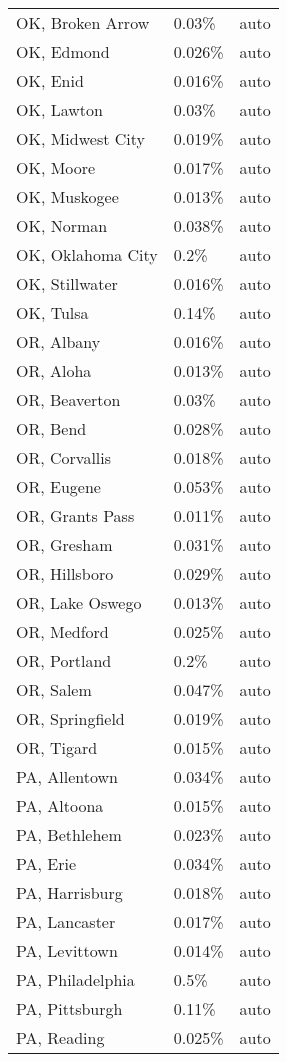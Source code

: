 \begin{longtable}[]{@{}lll@{}}
OK, Broken Arrow & 0.03\% & auto \\
OK, Edmond & 0.026\% & auto \\
OK, Enid & 0.016\% & auto \\
OK, Lawton & 0.03\% & auto \\
OK, Midwest City & 0.019\% & auto \\
OK, Moore & 0.017\% & auto \\
OK, Muskogee & 0.013\% & auto \\
OK, Norman & 0.038\% & auto \\
OK, Oklahoma City & 0.2\% & auto \\
OK, Stillwater & 0.016\% & auto \\
OK, Tulsa & 0.14\% & auto \\
OR, Albany & 0.016\% & auto \\
OR, Aloha & 0.013\% & auto \\
OR, Beaverton & 0.03\% & auto \\
OR, Bend & 0.028\% & auto \\
OR, Corvallis & 0.018\% & auto \\
OR, Eugene & 0.053\% & auto \\
OR, Grants Pass & 0.011\% & auto \\
OR, Gresham & 0.031\% & auto \\
OR, Hillsboro & 0.029\% & auto \\
OR, Lake Oswego & 0.013\% & auto \\
OR, Medford & 0.025\% & auto \\
OR, Portland & 0.2\% & auto \\
OR, Salem & 0.047\% & auto \\
OR, Springfield & 0.019\% & auto \\
OR, Tigard & 0.015\% & auto \\
PA, Allentown & 0.034\% & auto \\
PA, Altoona & 0.015\% & auto \\
PA, Bethlehem & 0.023\% & auto \\
PA, Erie & 0.034\% & auto \\
PA, Harrisburg & 0.018\% & auto \\
PA, Lancaster & 0.017\% & auto \\
PA, Levittown & 0.014\% & auto \\
PA, Philadelphia & 0.5\% & auto \\
PA, Pittsburgh & 0.11\% & auto \\
PA, Reading & 0.025\% & auto \\

\end{longtable}
